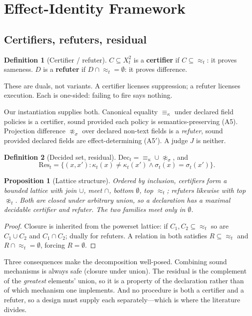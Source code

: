 \documentclass[10pt,twocolumn]{article}
\newtheorem{proposition}[theorem]{Proposition}
\theoremstyle{definition}
\newtheorem{definition}{Definition}
\theoremstyle{remark}
\newcommand{\aeq}{\approx_t}
\newcommand{\aneq}{\not\approx_t}
\newcommand{\Res}{\mathrm{Res}_t}
\newcommand{\Dec}{\mathrm{Dec}_t}
\begin{document}
\section{Effect-Identity Framework}
\subsection{Certifiers, refuters, residual}

\begin{definition}[Certifier / refuter]
$C \subseteq X_t^2$ is a \textbf{certifier} if $C \subseteq{\aeq}$: it proves
sameness. $D$ is a \textbf{refuter} if $D \cap {\aeq} = \emptyset$: it proves
difference.
\end{definition}

These are duals, not variants. A certifier licenses suppression; a refuter
licenses execution. Each is one-sided: failing to fire says nothing.

Our instantiation supplies both. Canonical equality $\equiv_\kappa$ under
declared field policies is a certifier, sound provided each policy is
semantics-preserving (A5). Projection difference $\not\approx_\sigma$ over
declared non-text fields is a \emph{refuter}, sound provided declared fields are
effect-determining (A5$'$). A judge $J$ is neither.

\begin{definition}[Decided set, residual]
$\Dec = {\equiv_\kappa} \cup {\not\approx_\sigma}$, and
\[
\Res = \{(x,x') : \kappa_t(x)\neq\kappa_t(x') \wedge \sigma_t(x)=\sigma_t(x')\}.
\]
\end{definition}

\begin{proposition}[Lattice structure]
\label{prop:lattice}
Ordered by inclusion, certifiers form a bounded lattice with join $\cup$, meet
$\cap$, bottom $\emptyset$, top $\aeq$; refuters likewise with top $\aneq$. Both
are closed under arbitrary union, so a declaration has a maximal decidable
certifier and refuter. The two families meet only in $\emptyset$.
\end{proposition}

\begin{proof}
Closure is inherited from the powerset lattice: if $C_1,C_2 \subseteq {\aeq}$ so
are $C_1\cup C_2$ and $C_1\cap C_2$; dually for refuters. A relation in both
satisfies $R \subseteq {\aeq}$ and $R \cap {\aeq} = \emptyset$, forcing
$R=\emptyset$.
\end{proof}

Three consequences make the decomposition well-posed. Combining sound mechanisms
is always safe (closure under union). The residual is the complement of the
\emph{greatest} elements' union, so it is a property of the declaration rather
than of which mechanism one implements. And no procedure is both a certifier and
a refuter, so a design must supply each separately---which is where the
literature divides.
\end{document}
